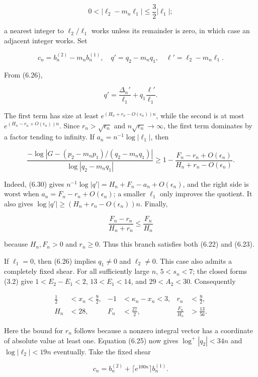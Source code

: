\documentclass[
  11pt,
]{article}
\begin{document}
\[
 0<|\ell_2-m_n\ell_1|\le\frac32|\ell_1|;             \tag{6.29}
\]

a nearest integer to \(\ell_2/\ell_1\) works unless its remainder is
zero, in which case an adjacent integer works. Set

\[
 c_n=b_n^{(2)}-m_nb_n^{(1)},\quad
 q'=q_2-m_nq_1,\quad \ell'=\ell_2-m_n\ell_1.
\]

From (6.26),

\[
 q'=\frac{\Delta_n'}{\ell_1}
     +q_1\frac{\ell'}{\ell_1}.                       \tag{6.30}
\]

The first term has size at least \(e^{(H_n+r_n-O(\epsilon_n))n}\), while
the second is at most \(e^{(H_n-r_n+O(\epsilon_n))n}\). Since
\(r_n>\sqrt{\epsilon_n}\) and \(n\sqrt{\epsilon_n}\to\infty\), the first
term dominates by a factor tending to infinity. If
\(a_n=n^{-1}\log|\ell_1|\), then

\[
 \frac{-\log|G-(p_2-m_np_1)/(q_2-m_nq_1)|}
 {\log|q_2-m_nq_1|}
 \ge
 1-\frac{F_n-r_n+O(\epsilon_n)}
          {H_n+r_n-O(\epsilon_n)}.                  \tag{6.31}
\]

Indeed, (6.30) gives \(n^{-1}\log|q'|=H_n+F_n-a_n+O(\epsilon_n)\), and
the right side is worst when \(a_n=F_n-r_n+O(\epsilon_n)\); a smaller
\(\ell_1\) only improves the quotient. It also gives
\(\log|q'|\ge(H_n+r_n-O(\epsilon_n))n\). Finally,

\[
 \frac{F_n-r_n}{H_n+r_n}\le\frac{F_n}{H_n}
\]

because \(H_n,F_n>0\) and \(r_n\ge0\). Thus this branch satisfies both
(6.22) and (6.23).

If \(\ell_1=0\), then (6.26) implies \(q_1\ne0\) and \(\ell_2\ne0\).
This case also admits a completely fixed shear. For all sufficiently
large \(n\), \(5<s_n<7\); the closed forms (3.2) give \(1<E_2-E_1<2\),
\(13<E_1<14\), and \(29<A_2<30\). Consequently

\[
 \begin{aligned}
 \tfrac12&<x_n<\tfrac92,& -1&<\kappa_n-x_n<3,&
 r_n&<\tfrac92,\\
 H_n&<28,& F_n&<\tfrac{27}{2},&
 \frac{F_n}{H_n}&>\frac{13}{56}.
 \end{aligned}                                      \tag{6.32a}
\]

Here the bound for \(r_n\) follows because a nonzero integral vector has
a coordinate of absolute value at least one. Equation (6.25) now gives
\(\log^+|q_2|<34n\) and \(\log|\ell_2|<19n\) eventually. Take the fixed
shear

\[
 c_n=b_n^{(2)}+\lceil e^{100n}\rceil b_n^{(1)}.
\]
\end{document}
